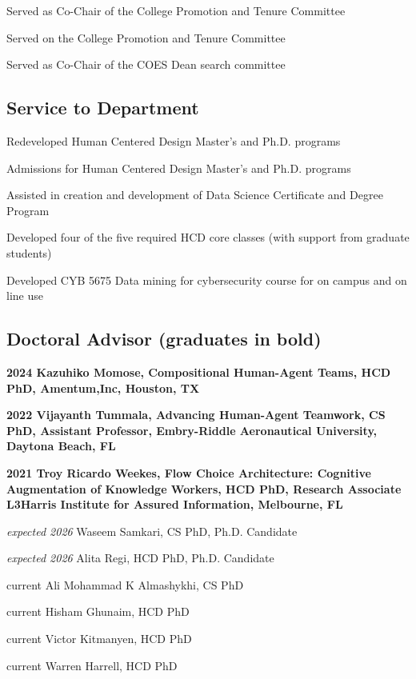 \documentclass[12pt,letterpaper]{report}
\newcommand{\listitemspace}{0.25em}
\renewenvironment{itemize}
{\begin{list}{}{\setlength{\leftmargin}{0em}
                \setlength{\parskip}{0em}
                \setlength{\itemsep}{\listitemspace}
                \setlength{\parsep}{\listitemspace}}}
{\end{list}}
\begin{document}
    \begin{itemize}
        \item Served as Co-Chair of the College Promotion and Tenure Committee
        \item Served on the College Promotion and Tenure Committee
        \item Served as Co-Chair of the COES Dean search committee
    \end{itemize}

    \subsection*{Service to Department}

    \begin{itemize}
        \item Redeveloped Human Centered Design Master's and Ph.D. programs
        \item Admissions for Human Centered Design Master's and Ph.D. programs
        \item Assisted in creation and development of Data Science Certificate and Degree Program
        \item Developed four of the five required HCD core classes (with support from graduate students)
        \item Developed CYB 5675 Data mining for cybersecurity course for on campus and on line use
    \end{itemize}

    \subsection*{Doctoral Advisor (graduates in bold)}

    \begin{itemize}
        \item \textbf{2024 Kazuhiko Momose, Compositional Human-Agent Teams, HCD PhD, Amentum,Inc, Houston, TX}
        \item \textbf{2022 Vijayanth Tummala, Advancing Human-Agent Teamwork, CS PhD, Assistant Professor, Embry-Riddle Aeronautical University, Daytona Beach, FL}
        \item \textbf{2021 Troy Ricardo Weekes, Flow Choice Architecture: Cognitive Augmentation of Knowledge Workers, HCD PhD, Research Associate L3Harris Institute for Assured Information, Melbourne, FL}
        \item \textit{expected 2026} Waseem Samkari, CS PhD, Ph.D. Candidate
        \item \textit{expected 2026} Alita Regi, HCD PhD, Ph.D. Candidate
        \item current Ali Mohammad K Almashykhi, CS PhD
        \item current Hisham Ghunaim, HCD PhD
        \item current Victor Kitmanyen, HCD PhD
        \item current Warren Harrell, HCD PhD
        
    \end{itemize}
\end{document}
